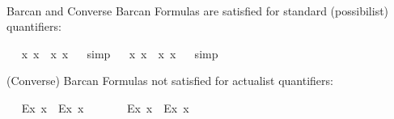 \begin{isabellebody}
%
\ %
%
\isamarkupfalse%
\ %
%
%
%
%
\begin{isamarkuptext}%
Barcan and Converse Barcan Formulas are satisfied for standard (possibilist) quantifiers:%
\end{isamarkuptext}\isamarkuptrue%
\ \isamarkupfalse%
\ {\isachardoublequoteopen}{\isasymlfloor}{\isacharparenleft}\isactrlbold {\isasymforall}x{\isachardot}\isactrlbold {\isasymbox}{\isacharparenleft}{\isasymphi}\ x{\isacharparenright}{\isacharparenright}\ \isactrlbold {\isasymrightarrow}\ \isactrlbold {\isasymbox}{\isacharparenleft}\isactrlbold {\isasymforall}x{\isachardot}{\isacharparenleft}{\isasymphi}\ x{\isacharparenright}{\isacharparenright}{\isasymrfloor}{\isachardoublequoteclose}%
\ %
%
\isamarkupfalse%
\ simp%
%
%
\isanewline
\ \isamarkupfalse%
\ {\isachardoublequoteopen}{\isasymlfloor}\isactrlbold {\isasymbox}{\isacharparenleft}\isactrlbold {\isasymforall}x{\isachardot}{\isacharparenleft}{\isasymphi}\ x{\isacharparenright}{\isacharparenright}\ \isactrlbold {\isasymrightarrow}\ {\isacharparenleft}\isactrlbold {\isasymforall}x{\isachardot}\isactrlbold {\isasymbox}{\isacharparenleft}{\isasymphi}\ x{\isacharparenright}{\isacharparenright}{\isasymrfloor}{\isachardoublequoteclose}%
\ %
%
\isamarkupfalse%
\ simp%
%
%
%
\begin{isamarkuptext}%
(Converse) Barcan Formulas not satisfied for actualist quantifiers:%
\end{isamarkuptext}\isamarkuptrue%
\ \isamarkupfalse%
\ {\isachardoublequoteopen}{\isasymlfloor}{\isacharparenleft}\isactrlbold {\isasymforall}\isactrlsup Ex{\isachardot}\isactrlbold {\isasymbox}{\isacharparenleft}{\isasymphi}\ x{\isacharparenright}{\isacharparenright}\ \isactrlbold {\isasymrightarrow}\ \isactrlbold {\isasymbox}{\isacharparenleft}\isactrlbold {\isasymforall}\isactrlsup Ex{\isachardot}{\isacharparenleft}{\isasymphi}\ x{\isacharparenright}{\isacharparenright}{\isasymrfloor}{\isachardoublequoteclose}\ \isamarkupfalse%
%
\ %
%
\isamarkupfalse%
\ %
%
%
%
\isanewline
\ \isamarkupfalse%
\ {\isachardoublequoteopen}{\isasymlfloor}\isactrlbold {\isasymbox}{\isacharparenleft}\isactrlbold {\isasymforall}\isactrlsup Ex{\isachardot}{\isacharparenleft}{\isasymphi}\ x{\isacharparenright}{\isacharparenright}\ \isactrlbold {\isasymrightarrow}\ {\isacharparenleft}\isactrlbold {\isasymforall}\isactrlsup Ex{\isachardot}\isactrlbold {\isasymbox}{\isacharparenleft}{\isasymphi}\ x{\isacharparenright}{\isacharparenright}{\isasymrfloor}{\isachardoublequoteclose}\ \isamarkupfalse%

\end{isabellebody}
